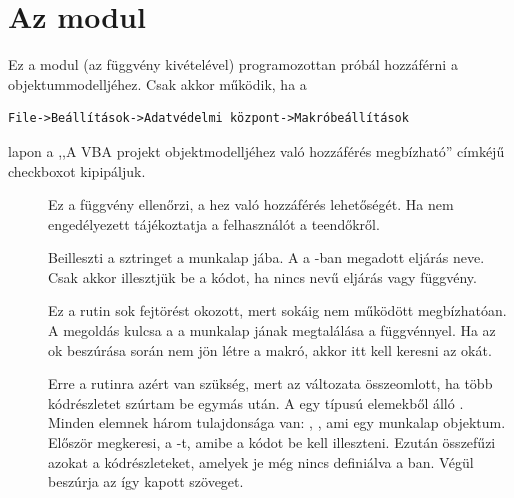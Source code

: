 \section{Az  modul}\label{sec:6.5}

Ez a modul (az  függvény kivételével) programozottan próbál
hozzáférni a   objektummodelljéhez. Csak akkor
működik, ha a
\begin{verbatim}
File->Beállítások->Adatvédelmi központ->Makróbeállítások
\end{verbatim}
lapon a ,,A VBA projekt objektmodelljéhez való hozzáférés megbízható''
címkéjű checkboxot kipipáljuk. 
\begin{description}
\item[] Ez a függvény ellenőrzi, a hez való hozzáférés lehetőségét. Ha nem
  engedélyezett tájékoztatja a felhasználót a teendőkről. 
\item[] 
  Beilleszti a 
  sztringet a  
   munkalap jába. A  a
  -ban megadott eljárás 
  neve. Csak akkor  illesztjük be a kódot, ha nincs 
  nevű eljárás vagy függvény. 
  
  Ez a rutin sok fejtörést okozott, mert sokáig nem működött
  megbízhatóan. A megoldás kulcsa a a munkalap 
  jának megtalálása a  függvénnyel. Ha az
  ok beszúrása során nem  jön létre a 
  makró, akkor itt kell keresni az okát. 
\item[] Erre a rutinra azért
  van szükség, mert az   változata összeomlott, ha több
  kódrészletet szúrtam be egymás után. A  egy  
  típusú elemekből álló . Minden elemnek három
  tulajdonsága van: , ,  ami egy munkalap
  objektum. Először megkeresi, a -t, amibe a kódot be 
  kell illeszteni. Ezután összefűzi azokat a kódrészleteket, amelyek
  je még nincs definiálva a ban. Végül
  beszúrja az így kapott szöveget. 


\end{description}

